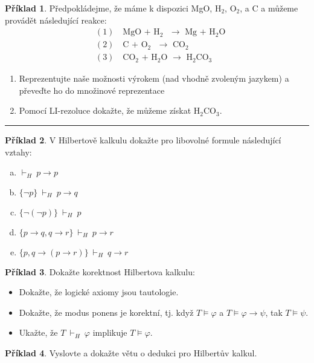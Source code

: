 \documentclass{amsart}
\theoremstyle{definition}
\newtheorem{problem}{Příklad}
\begin{document}
\begin{problem}Předpokládejme, že máme k dispozici MgO, H$_2$, O$_2$, a C a můžeme provádět následující reakce:
\begin{align*}&(1)\quad\text{MgO\ +\ H$_2$\ \ $\to$\ \ Mg\ +\ H$_2$O}\\
&(2)\quad\text{C\ +\ O$_2$\ \ $\to$\ \ CO$_2$}\\
&(3)\quad\text{CO$_2$\ +\ H$_2$O\ \ $\to$\ \ H$_2$CO$_3$}
\end{align*}
\begin{enumerate}
\item Reprezentujte naše možnosti výrokem (nad vhodně zvoleným jazykem) a převeďte ho do množinové reprezentace
\item Pomocí LI-rezoluce dokažte, že můžeme získat H$_2$CO$_3$.
\end{enumerate}
\end{problem}\medskip

\hrule

\begin{problem}
V Hilbertově kalkulu dokažte pro libovolné formule následující vztahy:
\begin{enumerate}[(a)]
\item $\vdash_H\ p\to p$
\item $\{\neg p\}\ \vdash_H\ p\to q$
\item $\{\neg(\neg p)\}\ \vdash_H\ p$
\item $\{p\to q,q \to r\}\ \vdash_H\ p\to r$
\item $\{p, q \to (p\to r)\}\ \vdash_H\ q\to r$

\end{enumerate}
\end{problem}\medskip

\begin{problem}
Dokažte korektnost Hilbertova kalkulu:
\begin{itemize}
    \item Dokažte, že logické axiomy jsou tautologie.
    \item Dokažte, že modus ponens je korektní, tj. když $T\models\varphi$ a $T\models\varphi\to\psi$, tak $T\models\psi$.
    \item Ukažte, že $T\ \vdash_H\ \varphi$ implikuje $T\models\varphi$.
\end{itemize}
\end{problem}\medskip

\begin{problem}
Vyslovte a dokažte větu o dedukci pro Hilbertův kalkul.
\end{problem}\medskip
\end{document}
